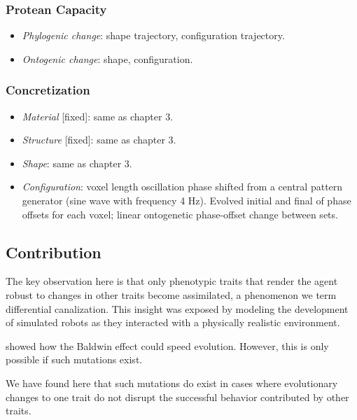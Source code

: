 \subsubsection*{Protean Capacity}

\begin{itemize}
    \item \textit{Phylogenic change}: shape trajectory, configuration trajectory.
    \item \textit{Ontogenic change}: shape, configuration.
\end{itemize}


\subsubsection*{Concretization}

\begin{itemize}
    \item \textit{Material} [fixed]: same as chapter 3.
    \item \textit{Structure} [fixed]: same as chapter 3.
    \item \textit{Shape}: same as chapter 3.
    \item \textit{Configuration}: voxel length oscillation phase shifted from a central pattern generator (sine wave with frequency 4 Hz).
    Evolved initial and final of phase offsets for each voxel; linear ontogenetic phase-offset change between sets.
\end{itemize}




\subsection{Contribution}


The key observation here is that only phenotypic traits that render the agent robust to changes in other traits become assimilated, a phenomenon we term differential canalization. 
This insight was exposed by modeling the development of simulated robots as they interacted with a physically realistic environment.

\citet{hinton1987learning} showed how the Baldwin effect could speed evolution.
However, this is only possible if such mutations exist.

We have found here that such mutations do exist in cases where evolutionary changes
to one trait do not disrupt the successful behavior contributed
by other traits.


